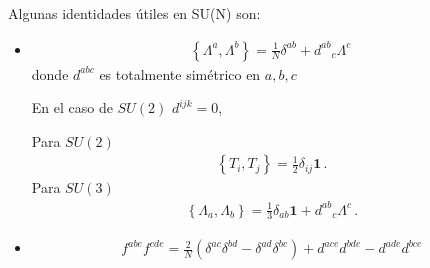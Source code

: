 
Algunas identidades útiles en SU(N) son:

\begin{itemize}
\item 
\begin{align}
  \left\{ \Lambda^{a},\Lambda^{b} \right\}=\frac{1}{N}\delta^{ab}+{d^{ab}}_c \Lambda^{c}\,
\end{align}
donde $d^{abc}$ es totalmente simétrico en $a,b,c$

 En el caso de $SU(2)$ $d^{ijk}=0$, 

Para  $SU(2)$
\begin{align}
\left\{T_i,T_j\right\}=\frac{1}{2}\delta_{ij}\mathbf{1}\,.
\end{align}
Para  $SU(3)$
\begin{align}
\left\{\Lambda_a,\Lambda_b\right\}=\frac{1}{3}\delta_{ab}\mathbf{1}+{d^{ab}}_c \Lambda^{c}\,.
\end{align}

\item 
\begin{align}
  f^{abe}f^{cde}=\frac{2}{N}(\delta^{ac}\delta^{bd}-
 \delta^{ad}\delta^{bc})+d^{ace}d^{bde}-d^{ade}d^{bce}
\end{align}
\end{itemize}



